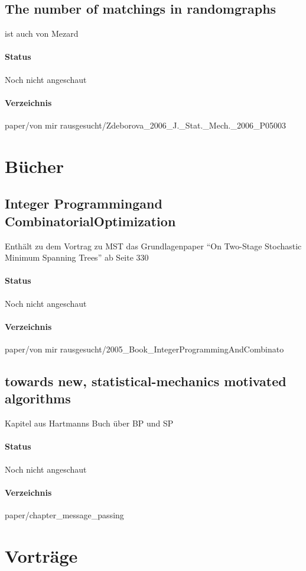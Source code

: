 \documentclass[paper=a4,10pt]{scrartcl}
\begin{document}
\subsection{The number of matchings in randomgraphs}

ist auch von Mezard

\paragraph{Status} Noch nicht angeschaut
\paragraph{Verzeichnis} paper/von mir rausgesucht/Zdeborova\_2006\_J.\_Stat.\_Mech.\_2006\_P05003


\section{Bücher}
\subsection{Integer Programmingand CombinatorialOptimization}

Enthält zu dem Vortrag zu MST das Grundlagenpaper ``On Two-Stage Stochastic Minimum Spanning Trees'' ab Seite 330

\paragraph{Status} Noch nicht angeschaut
\paragraph{Verzeichnis} paper/von mir rausgesucht/2005\_Book\_IntegerProgrammingAndCombinato

\subsection{towards new, statistical-mechanics motivated algorithms}
Kapitel aus Hartmanns Buch über BP und SP

\paragraph{Status} Noch nicht angeschaut
\paragraph{Verzeichnis} paper/chapter\_message\_passing

\section{Vorträge}
\end{document}
